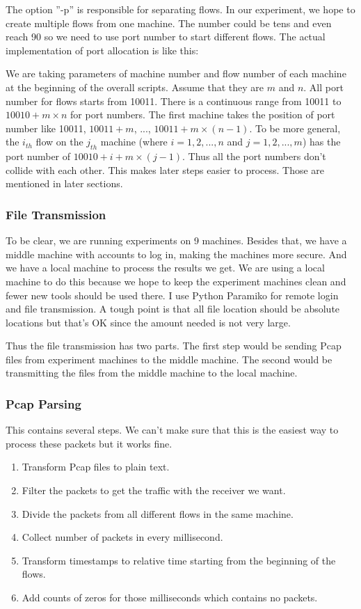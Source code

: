 \documentclass[12pt,a4paper]{article}
\begin{document}
The option ''-p'' is responsible for separating flows. In our experiment, we hope to create multiple flows from one machine.
The number could be tens and even reach 90 so we need to use port number to start different flows.
The actual implementation of port allocation is like this: 

We are taking parameters of machine number and flow number of each machine at the beginning of the overall scripts.
Assume that they are $m$ and $n$.
All port number for flows starts from 10011. There is a continuous range from 10011 to $10010+m\times n$ for port numbers.
The first machine takes the position of port number like 10011, $10011+m$, ..., $10011+m\times(n-1)$.
To be more general, the $i_{th}$ flow on the $j_{th}$ machine (where $i=1,2,...,n$ and $j=1,2,...,m$) has the port number of
$10010+i+m\times(j-1)$.
Thus all the port numbers don't collide with each other. This makes later steps easier to process.
Those are mentioned in later sections.

\subsubsection{File Transmission}
To be clear, we are running experiments on 9 machines.
Besides that, we have a middle machine with accounts to log in, making the machines more secure.
And we have a local machine to process the results we get. We are using a local machine to do this because
we hope to keep the experiment machines clean and fewer new tools should be used there.
I use Python Paramiko for remote login and file transmission.
A tough point is that all file location should be absolute locations but that's OK since the amount needed is not very large.

Thus the file transmission has two parts. The first step would be sending Pcap files from experiment machines to the middle machine.
The second would be transmitting the files from the middle machine to the local machine.

\subsubsection{Pcap Parsing}
This contains several steps. We can't make sure that this is the easiest way to process these packets but it works fine.
\begin{enumerate}
	\item Transform Pcap files to plain text.
	\item Filter the packets to get the traffic with the receiver we want.
	\item Divide the packets from all different flows in the same machine.
	\item Collect number of packets in every millisecond.
	\item Transform timestamps to relative time starting from the beginning of the flows.
	\item Add counts of zeros for those milliseconds which contains no packets.
\end{enumerate}
\end{document}
